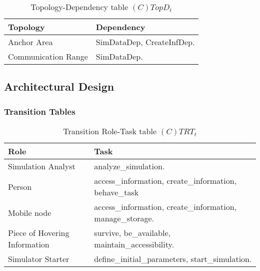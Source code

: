 \begin{table}[H]
	\centering
	\begin{tabular}{|p{4cm}|p{8cm}|}
			\hline
			\textbf{Topology} & \textbf{Dependency} \\
			\hline
			Anchor Area & SimDataDep, CreateInfDep.\\
			\hline
			Communication Range & SimDataDep. \\
			\hline
		\end{tabular}
	\caption{Topology-Dependency table $(C)TopD_t$}
	\label{tab:ctopdt}
\end{table}

\subsection{Architectural Design}

\subsubsection{Transition Tables}

\begin{table}[H]
	\centering
	\begin{tabular}{|p{4cm}|p{8cm}|}
			\hline
			\textbf{Role} & \textbf{Task} \\
			\hline
			Simulation Analyst & analyze\_simulation.   \\
			\hline
			Person & access\_information, create\_information, behave\_task \\
			\hline
			Mobile node & access\_information, create\_information, manage\_storage.
			\\
			\hline
			Piece of Hovering Information & survive, be\_available,
			maintain\_accessibility. \\
			\hline
			Simulator Starter & define\_initial\_parameters, start\_simulation. \\
			\hline
		\end{tabular}
	\caption{Transition Role-Task table $(C)TRT_t$}
	\label{tab:ctrtt}
\end{table}

